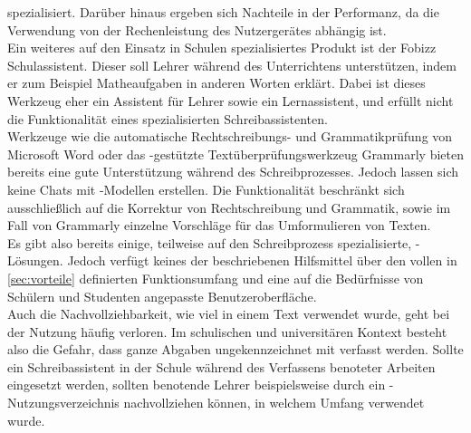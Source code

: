 \documentclass[../main.tex]{subfiles}
\begin{document}
spezialisiert. Darüber hinaus ergeben sich Nachteile in der Performanz, da die Verwendung von der Rechenleistung des Nutzergerätes abhängig ist.\cite{ollamaSchreibassi}\\
Ein weiteres auf den Einsatz in Schulen spezialisiertes Produkt ist der Fobizz Schulassistent. Dieser soll Lehrer während des Unterrichtens unterstützen, indem er zum Beispiel 
Matheaufgaben in anderen Worten erklärt. Dabei ist dieses Werkzeug eher ein Assistent für Lehrer sowie ein Lernassistent, und erfüllt nicht die Funktionalität eines spezialisierten 
Schreibassistenten.\cite{fobizz}\\ 
Werkzeuge wie die automatische Rechtschreibungs- und Grammatikprüfung von Microsoft Word oder das -gestützte Textüberprüfungswerkzeug Grammarly bieten bereits eine gute 
Unterstützung während des Schreibprozesses. Jedoch lassen sich keine Chats mit -Modellen erstellen. Die Funktionalität beschränkt sich ausschließlich auf die Korrektur von 
Rechtschreibung und Grammatik, sowie im Fall von Grammarly einzelne Vorschläge für das Umformulieren von Texten.\cite{microsoftword,grammarly}\\
Es gibt also bereits einige, teilweise auf den Schreibprozess spezialisierte, -Lösungen. Jedoch verfügt keines der beschriebenen Hilfsmittel über den vollen in \autoref{sec:vorteile}
definierten Funktionsumfang und eine auf die Bedürfnisse von Schülern und Studenten angepasste Benutzeroberfläche.\\
Auch die Nachvollziehbarkeit, wie viel  in einem Text verwendet 
wurde, geht bei der Nutzung häufig verloren. Im schulischen und universitären Kontext besteht also die Gefahr, dass ganze Abgaben ungekennzeichnet mit  verfasst werden. Sollte ein 
Schreibassistent in der Schule während des Verfassens benoteter Arbeiten eingesetzt werden, sollten benotende Lehrer beispielsweise durch ein -Nutzungsverzeichnis 
nachvollziehen können, in welchem Umfang  verwendet wurde.
\end{document}
